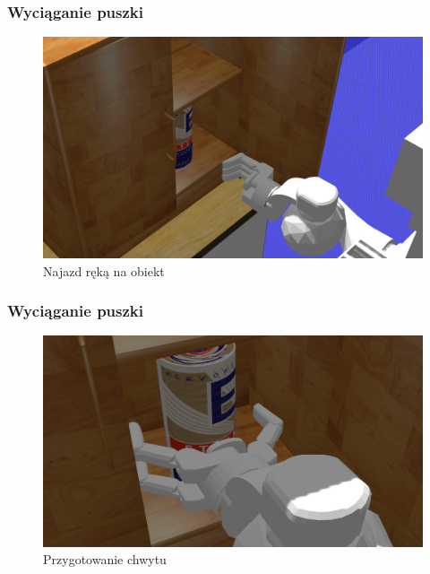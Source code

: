 \addtocounter{framenumber}{-1}
\begin{frame}
	\frametitle{Wyciąganie puszki}
	\begin{figure}[b]
        \label{sim_map}
        \centering
        \def\svgwidth{\columnwidth}
        \includegraphics[scale=0.3]{images/testpuszka/najazd_reka_na_psuzke.png}
        \caption{Najazd ręką na obiekt}
    \end{figure}
\end{frame}

\addtocounter{framenumber}{-1}
\begin{frame}
	\frametitle{Wyciąganie puszki}
	\begin{figure}[b]
        \label{sim_map}
        \centering
        \def\svgwidth{\columnwidth}
        \includegraphics[scale=0.25]{images/testpuszka/chwyt.png}
        \caption{Przygotowanie chwytu}
    \end{figure}
\end{frame}

